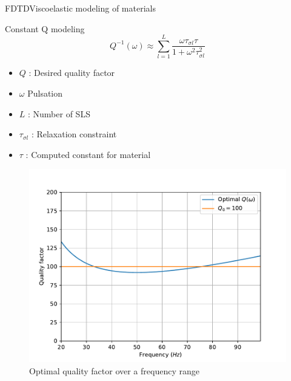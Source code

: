 \documentclass[9pt, xcolor={usenames, dvipsnames}]{beamer}
\begin{document}
				\begin{frame}{FDTD}{Viscoelastic modeling of materials~}
					\begin{minipage}[t]{0.48\textwidth}

						\begin{alertblock}{Constant Q modeling}
							\begin{equation}
								Q^{-1}(\omega) \approx \sum_{l=1}^L \frac{\omega \tau_{\sigma l} \tau}{1 + \omega^2\tau_{\sigma l}^2}
							\end{equation}
							\begin{itemize}
								\item $Q$ : Desired quality factor 
								\item $\omega$ Pulsation
								\item $L$ : Number of SLS
								\item $\tau_{\sigma l}$ : Relaxation constraint
								\item $\tau$ : Computed constant for material
							\end{itemize}
						\end{alertblock}
					\end{minipage}
					\hfill
					\begin{minipage}[t]{0.48\textwidth}
						\begin{figure}
							\includegraphics[width=\textwidth]{images/quality_factor.pdf}
							\caption{Optimal quality factor over a frequency range}
						\end{figure}
					\end{minipage}
				\end{frame}
\end{document}
